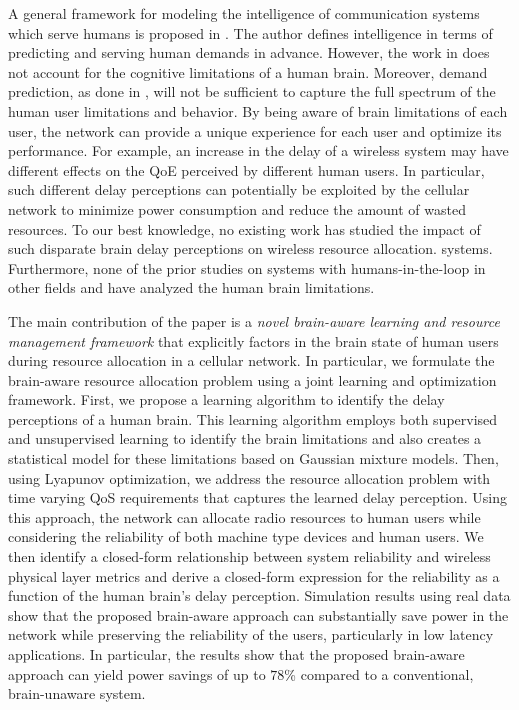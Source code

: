 \documentclass[journal,draftclsnofoot,onecolumn,12pt]{IEEEtran}%
\begin{document}
	
	A general framework for modeling the intelligence of communication systems which serve humans is proposed in \cite{huang2016system}. The author defines  intelligence in terms of predicting  and serving human demands in advance.
	However, the work in \cite{huang2016system} does not account for the cognitive limitations of a human brain. Moreover,  demand prediction, as done in \cite{huang2016system}, will not be sufficient to capture the full spectrum of the human user limitations and behavior. 
    By being aware of brain limitations of each user, the  network can provide a unique experience for each user and optimize its performance.
	For example, an increase in the delay of a wireless system  may have different effects on the QoE perceived by different human users. 
	In particular, such different delay perceptions can potentially be exploited by the cellular network to minimize power consumption and reduce the amount of wasted resources. To our best knowledge, no existing work has studied the impact of such disparate brain delay perceptions on wireless resource allocation. 
	systems.
	{Furthermore, none of the prior studies on systems with humans-in-the-loop in other fields \cite{reviewer3Cybernetics} and \cite{reviewer4ImagePro} have analyzed the human brain limitations.}
	
	{The main contribution of the paper is a \emph{novel brain-aware learning and resource management framework} that  explicitly factors in the brain state of human users during resource allocation in a cellular network.}
	In particular, we  formulate the brain-aware resource allocation problem using a joint learning and optimization framework. {First, we propose a learning algorithm to identify the delay perceptions of a human brain.} This learning algorithm employs both supervised and unsupervised learning to identify the brain limitations and also creates a statistical model for these limitations based on Gaussian mixture models. Then, using Lyapunov optimization, we address the resource allocation problem with time varying QoS requirements that captures the learned delay perception. Using this approach, the network can allocate radio resources to human users while considering the reliability of both machine type devices and human users. We then identify a closed-form relationship between system reliability and wireless physical layer metrics  and derive a closed-form expression for the reliability as a function of the human brain's delay perception. Simulation results using real data show that the proposed brain-aware approach can substantially save power in the network while preserving the reliability of the users, particularly in low latency applications. In particular, the results show that the proposed brain-aware approach can yield power savings of up to $78$\% compared to a conventional, brain-unaware system.   
	
\end{document}
